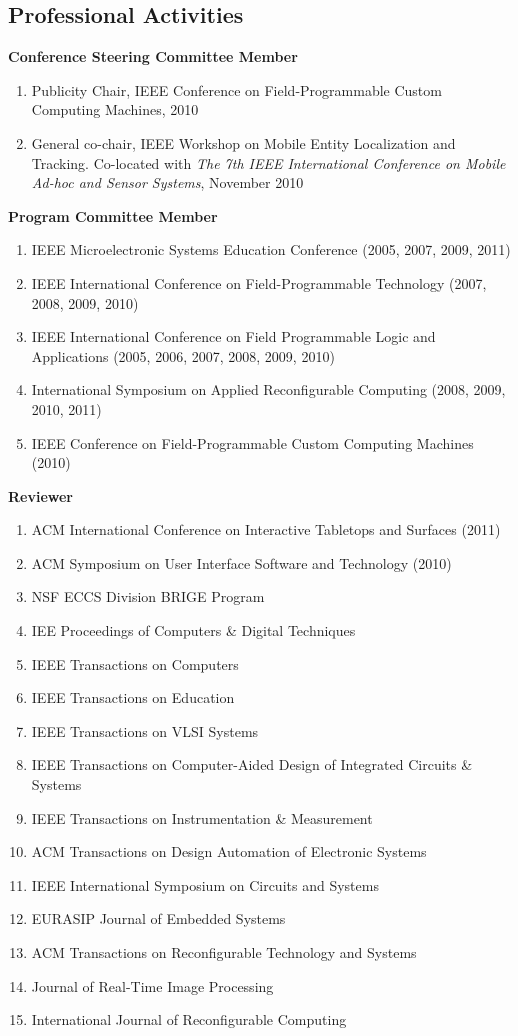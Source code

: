 \documentclass[line]{res}
\begin{document}
\begin{resume}
	\section{\sc Professional Activities}
	
	\textbf{Conference Steering Committee Member}
	\begin{enumerate}
		\item Publicity Chair, IEEE Conference on Field-Programmable Custom Computing Machines, 2010 
		\item General co-chair, IEEE Workshop on Mobile Entity Localization and Tracking. Co-located with \textit{The 7th IEEE International Conference on Mobile Ad-hoc and Sensor Systems}, November 2010 
	\end{enumerate}
	
	\textbf{Program Committee Member}
	\begin{enumerate}
		\item IEEE Microelectronic Systems Education Conference (2005, 2007, 2009, 2011) 
		\item IEEE International Conference on Field-Programmable Technology (2007, 2008, 2009, 2010) 
		\item IEEE International Conference on Field Programmable Logic and Applications (2005, 2006, 2007, 2008, 2009, 2010) 
		\item International Symposium on Applied Reconfigurable Computing (2008, 2009, 2010, 2011) 
		\item IEEE Conference on Field-Programmable Custom Computing Machines (2010) 
	\end{enumerate}
	
	\textbf{Reviewer}
	\begin{enumerate}
		\item ACM International Conference on Interactive Tabletops and Surfaces (2011)
		\item ACM Symposium on User Interface Software and Technology (2010) 
		\item NSF ECCS Division BRIGE Program 
		\item IEE Proceedings of Computers \& Digital Techniques 
		\item IEEE Transactions on Computers 
		\item IEEE Transactions on Education 
		\item IEEE Transactions on VLSI Systems 
		\item IEEE Transactions on Computer-Aided Design of Integrated Circuits \& Systems 
		\item IEEE Transactions on Instrumentation \& Measurement 
		\item ACM Transactions on Design Automation of Electronic Systems 
		\item IEEE International Symposium on Circuits and Systems 
		\item EURASIP Journal of Embedded Systems 
		\item ACM Transactions on Reconfigurable Technology and Systems 
		\item Journal of Real-Time Image Processing 
		\item International Journal of Reconfigurable Computing 
	\end{enumerate}
	

\end{resume}
\end{document}
